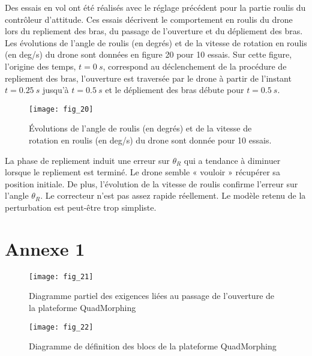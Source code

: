 \ifprof
\else
Des essais en vol ont été réalisés avec le réglage précédent pour la partie roulis du contrôleur
d’attitude. Ces essais décrivent le comportement en roulis du drone lors du repliement des
bras, du passage de l’ouverture et du dépliement des bras. Les évolutions de l’angle de
roulis (en degrés) et de la vitesse de rotation en roulis (en \si{deg/s}) du drone sont données
en figure 20 pour 10 essais. Sur cette figure, l’origine des temps, $t = \SI{0}{s}$, correspond au
déclenchement de la procédure de repliement des bras, l’ouverture est traversée par le drone
à partir de l’instant $t = \SI{0,25}{s}$ jusqu’à $t = \SI{0,5}{s}$ et le dépliement des bras débute pour $t = \SI{0,5}{s}$.

\begin{figure}[H]
\centering
\texttt{[image: fig\_20]}
\caption{\label{fig_ccinppsi2022:20} ­Évolutions de l’angle de roulis (en degrés) et de la vitesse de rotation en roulis
(en \si{deg/s}) du drone sont donnée pour 10 essais.}
\end{figure}
\fi

\ifprof
\begin{corrige}
La phase de repliement induit une erreur sur $\theta_R$ qui a tendance à diminuer lorsque le repliement est terminé. Le drone semble « vouloir » récupérer sa position initiale. 
De plus, l’évolution de la vitesse de roulis confirme l’erreur sur l’angle $\theta_R$.
Le correcteur n’est pas assez rapide réellement. Le modèle retenu de la perturbation est peut-être trop simpliste.

\end{corrige}
\else
\fi

\ifprof
\else
\newpage

\section*{Annexe 1}


\begin{figure}[H]
\centering
\texttt{[image: fig\_21]}
\caption{\label{fig_ccinppsi2022:21} Diagramme partiel des exigences liées au passage de l’ouverture de la plateforme QuadMorphing}
\end{figure}

\begin{figure}[H]
\centering
\texttt{[image: fig\_22]}
\caption{\label{fig_ccinppsi2022:22} Diagramme de définition des blocs de la plateforme QuadMorphing}
\end{figure}
\fi